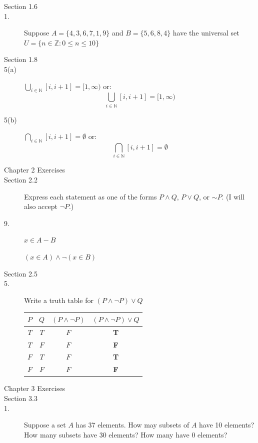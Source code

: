 \documentclass{article}
\begin{document}
\begin{description}
\item[Section 1.6]
\item[1.] Suppose $A=\{4,3,6,7,1,9\}$ and $B=\{5,6,8,4\}$ have the
  universal set $U=\{n\in\mathbb{Z}:0\leq n \leq 10\}$

\item[Section 1.8]
\item[5(a)] $\bigcup_{i\in\mathbb{N}} [i,i+1] = [1,\infty)$ or:
  \[\bigcup_{i\in\mathbb{N}} [i,i+1] = [1,\infty)\]

  \item[5(b)] $\bigcap_{i\in\mathbb{N}} [i,i+1] = \emptyset$ or:
    \[\bigcap_{i\in\mathbb{N}} [i,i+1] = \emptyset\]


\item[Chapter 2 Exercises]

\item[Section 2.2]  Express each statement as one of the forms $P\wedge Q$,
  $P\vee Q$, or $\sim P$.  (I will also accept $\neg P$.)
\item [9.] $x\in A-B$

  $(x\in A) \wedge \neg(x\in B)$

\item[Section 2.5]

\item[5.] Write a truth table for $(P\wedge \neg P)\vee Q$
  
  \begin{tabular}{|c|c||c||c|}\hline
    $P$  &   $Q$  & $(P\wedge \neg P)$  &   $(P\wedge \neg P)\vee Q$ \\\hline\hline
    $T$  & $T$  &  $F$  &  {\bf T} \\\hline
    $T$  & $F$  &  $F$  &  {\bf F} \\\hline
    $F$  & $T$  &  $F$  &  {\bf T} \\\hline
    $F$  & $F$  &  $F$  &  {\bf F} \\\hline
  \end{tabular}
  
\item[Chapter 3 Exercises]
\item[Section 3.3]
\item[1.] Suppose a set $A$ has 37 elements.  How may subsets of $A$
  have 10 elements?  How many subsets have 30 elements?  How many have
  0 elements?


\end{description}
\end{document}
